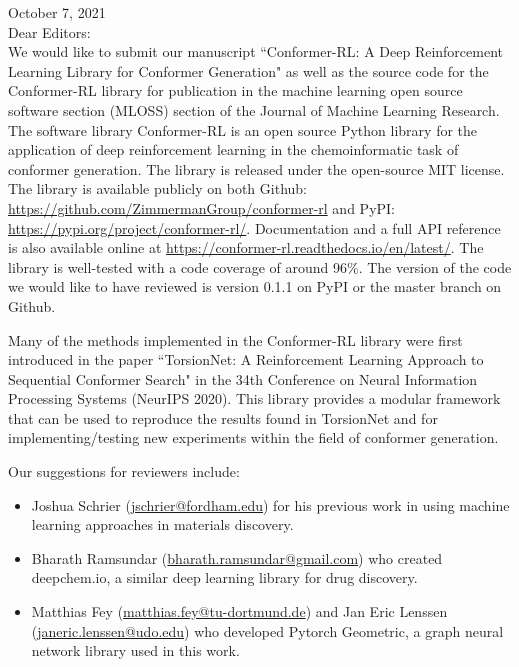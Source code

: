 \documentclass[twoside,11pt]{article}
\begin{document}
    \noindent October 7, 2021 \\
    \noindent Dear Editors: \\
    
    We would like to submit our manuscript ``Conformer-RL: A Deep Reinforcement Learning Library for Conformer Generation" as well as the source code for the Conformer-RL library for publication in the machine learning open source software section (MLOSS) section of the Journal of Machine Learning Research. The software library Conformer-RL is an open source Python library for the application of deep reinforcement learning in the chemoinformatic task of conformer generation. The library is released under the open-source MIT license. The library is available publicly on both Github: \url{https://github.com/ZimmermanGroup/conformer-rl} and PyPI: \url{https://pypi.org/project/conformer-rl/}. Documentation and a full API reference is also available online at \url{https://conformer-rl.readthedocs.io/en/latest/}. The library is well-tested with a code coverage of around 96\%. The version of the code we would like to have reviewed is version 0.1.1 on PyPI or the master branch on Github. 
    
    \medskip

    Many of the methods implemented in the Conformer-RL library were first introduced in the paper ``TorsionNet: A Reinforcement Learning Approach to Sequential Conformer Search" in the 34th Conference on Neural Information Processing Systems (NeurIPS 2020). This library provides a modular framework that can be used to reproduce the results found in TorsionNet and for implementing/testing new experiments within the field of conformer generation.

    \medskip
    
    Our suggestions for reviewers include:
    \begin{itemize}
        \item Joshua Schrier (\url{jschrier@fordham.edu}) for his previous work in using machine learning approaches in materials discovery.
        \item Bharath Ramsundar (\url{bharath.ramsundar@gmail.com}) who created deepchem.io, a similar deep learning library for drug discovery.
        \item Matthias Fey (\url{matthias.fey@tu-dortmund.de}) and Jan Eric Lenssen (\url{janeric.lenssen@udo.edu}) who developed Pytorch Geometric, a graph neural network library used in this work.
    \end{itemize}
\end{document}
